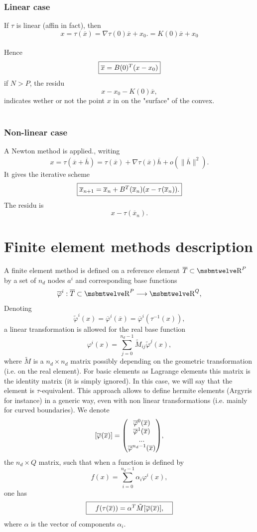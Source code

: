 \documentclass[11pt,a4paper]{article}
\begin{document}
\subsubsection*{Linear case}
If $\tau$ is linear (affin in fact), then \\
$$x = \tau(\overline{x}) = \nabla \tau(0) \overline{x} + x_0. = K(0)\overline{x} + x_0$$ \\
Hence
$$\fbox{$\overline{x} = B(0)^T(x - x_0)$}$$
if $N > P$, the residu \\
$$x - x_0 -  K(0) \overline{x}, $$
indicates wether or not the point $x$ in on the "surface" of the convex. \\ 
\\ \subsubsection*{Non-linear case}
A Newton method is applied., writing
$$x = \tau(\overline{x}+\overline{h}) = \tau(\overline{x})
+ \nabla \tau(\overline{x})\overline{h} + o(\|\overline{h}\|^2). $$
It gives the iterative scheme
$$\fbox{$ \overline{x}_{n+1} = \overline{x}_{n}
+ B^T(\overline{x}_{n})(x - \tau(\overline{x}_{n})).$} $$
The residu is
$$ x - \tau(\overline{x}_{n}).$$

\section{Finite element methods description}

A finite element method is defined on a reference element $\overline{T} \subset \Reel^P$ by a set of $n_d$ nodes $a^i$ and corresponding base functions 
$$ \overline{\varphi}^i : \overline{T} \subset \Reel^P \longrightarrow \Reel^Q, $$
Denoting
$$ \tilde{\varphi}^i(x) = \overline{\varphi}^i(\overline{x}) = \overline{\varphi}^i(\tau^{-1}(x)), $$
a linear transformation is allowed for the real base function
$$ \varphi^i(x) = \sum_{j = 0}^{n_d - 1} \tilde{M}_{ij} \tilde{\varphi}^j(x), $$
where $\tilde{M}$ is a $n_d \times n_d$ matrix possibly depending on the geometric transformation (i.e. on the real element). For basic elements as Lagrange elements this matrix is the identity matrix (it is simply ignored). In this case, we will say that the element is $\tau$-equivalent. This approach allows to define hermite elements (Argyris for instance) in a generic way, even with non linear transformations (i.e. mainly for curved boundaries).
We denote
$$ [\overline{\varphi}(\overline{x})] = {\left(\hspace{-.5em}\begin{array}{c} {\overline{\varphi}^0(\overline{x})} \\ {\overline{\varphi}^1(\overline{x})} \\ {...} \\ {\overline{\varphi}^{n_d-1}(\overline{x})} \end{array}\hspace{-.5em}\right)}, $$
the $n_d \times Q$ matrix, such that when a function is defined by
$$ f(x) = \sum_{i = 0}^{n_d - 1} \alpha_i \varphi^i(x), $$
one has
$$ \fbox{$\hspace{1em} f(\tau(\overline{x})) = \alpha^T \tilde{M} [\overline{\varphi}(\overline{x})],\hspace{1em}$} $$
where $\alpha$ is the vector of components $\alpha_i$.
\end{document}
